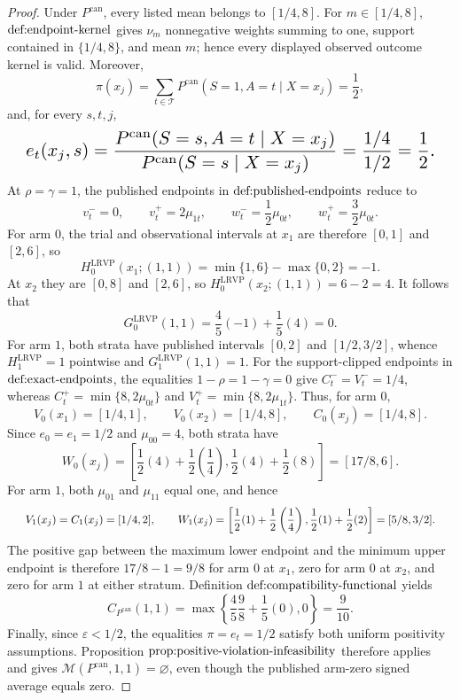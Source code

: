 \documentclass{article}
\begin{document}
\begin{proof}
Under \(P^{\mathrm{can}}\), every listed mean belongs to \([1/4,8]\). For \(m\in[1/4,8]\), \(\textup{def:endpoint-kernel}\) gives \(\nu_m\) nonnegative weights summing to one, support contained in \(\{1/4,8\}\), and mean \(m\); hence every displayed observed outcome kernel is valid. Moreover,\[\pi(x_j)=\sum_{t\in\mathcal T}P^{\mathrm{can}}(S=1,A=t\mid X=x_j)=\frac12,\]and, for every \(s,t,j\),\[
\makebox[\linewidth][c]{\resizebox{0.98\linewidth}{!}{\par\noindent \makebox[\linewidth][c]{\resizebox{0.98\linewidth}{!}{\(\displaystyle \displaystyle e_t(x_j,s)=\frac{P^{\mathrm{can}}(S=s,A=t\mid X=x_j)}{P^{\mathrm{can}}(S=s\mid X=x_j)}=\frac{1/4}{1/2}=\frac12.\)}}\par\noindent}}
\]At \(\rho=\gamma=1\), the published endpoints in \(\textup{def:published-endpoints}\) reduce to\[v_t^-=0,\qquad v_t^+=2\mu_{1t},\qquad w_t^-=\frac12\mu_{0t},\qquad w_t^+=\frac32\mu_{0t}.\]For arm \(0\), the trial and observational intervals at \(x_1\) are therefore \([0,1]\) and \([2,6]\), so\[H_0^{\mathrm{LRVP}}(x_1;(1,1))=\min\{1,6\}-\max\{0,2\}=-1.\]At \(x_2\) they are \([0,8]\) and \([2,6]\), so \(H_0^{\mathrm{LRVP}}(x_2;(1,1))=6-2=4\). It follows that\[G_0^{\mathrm{LRVP}}(1,1)=\frac45(-1)+\frac15(4)=0.\]For arm \(1\), both strata have published intervals \([0,2]\) and \([1/2,3/2]\), whence \(H_1^{\mathrm{LRVP}}=1\) pointwise and \(G_1^{\mathrm{LRVP}}(1,1)=1\). For the support-clipped endpoints in \(\textup{def:exact-endpoints}\), the equalities \(1-\rho=1-\gamma=0\) give \(C_t^-=V_t^-=1/4\), whereas \(C_t^+=\min\{8,2\mu_{0t}\}\) and \(V_t^+=\min\{8,2\mu_{1t}\}\). Thus, for arm \(0\),\[V_0(x_1)=[1/4,1],\qquad V_0(x_2)=[1/4,8],\qquad C_0(x_j)=[1/4,8].\]Since \(e_0=e_1=1/2\) and \(\mu_{00}=4\), both strata have\[W_0(x_j)=\left[\frac12(4)+\frac12\left(\frac14\right),\frac12(4)+\frac12(8)\right]=[17/8,6].\]For arm \(1\), both \(\mu_{01}\) and \(\mu_{11}\) equal one, and hence\[
\makebox[\linewidth][c]{\resizebox{0.98\linewidth}{!}{\par\noindent \makebox[\linewidth][c]{\resizebox{0.98\linewidth}{!}{\(\displaystyle \displaystyle V_1(x_j)=C_1(x_j)=[1/4,2],\qquad W_1(x_j)=\left[\frac12(1)+\frac12\left(\frac14\right),\frac12(1)+\frac12(2)\right]=[5/8,3/2].\)}}\par\noindent}}
\]The positive gap between the maximum lower endpoint and the minimum upper endpoint is therefore \(17/8-1=9/8\) for arm \(0\) at \(x_1\), zero for arm \(0\) at \(x_2\), and zero for arm \(1\) at either stratum. Definition \(\textup{def:compatibility-functional}\) yields\[C_{P^{\mathrm{can}}}(1,1)=\max\left\{\frac45\frac98+\frac15(0),0\right\}=\frac9{10}.\]Finally, since \(\varepsilon<1/2\), the equalities \(\pi=e_t=1/2\) satisfy both uniform positivity assumptions. Proposition \(\textup{prop:positive-violation-infeasibility}\) therefore applies and gives \(\mathcal M(P^{\mathrm{can}},1,1)=\varnothing\), even though the published arm-zero signed average equals zero.
\end{proof}
\end{document}
